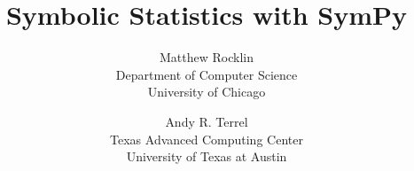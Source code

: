 

\title{Symbolic Statistics with SymPy}
\author{
Matthew Rocklin \\
Department of Computer Science\\
University of Chicago

\and

Andy R. Terrel \\
Texas Advanced Computing Center \\
University of Texas at Austin
}

\date{}
%

\maketitle













